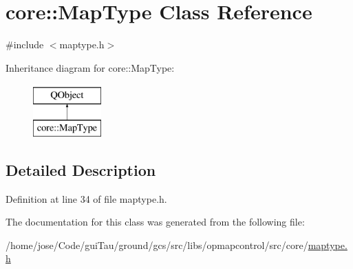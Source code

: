 \hypertarget{classcore_1_1_map_type}{\section{core\-:\-:Map\-Type Class Reference}
\label{classcore_1_1_map_type}
}


{\ttfamily \#include $<$maptype.\-h$>$}

Inheritance diagram for core\-:\-:Map\-Type\-:\begin{figure}[H]
\begin{center}
\leavevmode
\includegraphics[height=2.000000cm]{classcore_1_1_map_type}
\end{center}
\end{figure}


\subsection{Detailed Description}


Definition at line 34 of file maptype.\-h.



The documentation for this class was generated from the following file\-:\begin{DoxyCompactItemize}
\item 
/home/jose/\-Code/gui\-Tau/ground/gcs/src/libs/opmapcontrol/src/core/\hyperlink{maptype_8h}{maptype.\-h}\end{DoxyCompactItemize}
